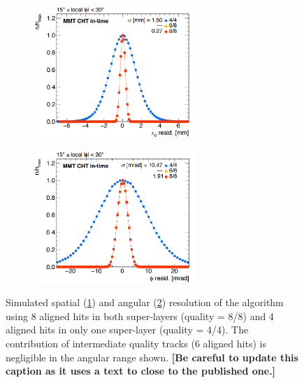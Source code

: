 	\begin{figure}[H]
		\begin{subfigure}{0.5\linewidth}
			\centering
			\includegraphics[height=5cm]{fig/chapt3/DT-spatial-res-algo.png}
			\caption{\label{fig:DT-P2-res:A}}
		\end{subfigure}
		\begin{subfigure}{0.5\linewidth}
			\centering
			\includegraphics[height=5cm]{fig/chapt3/DT-angular-res-algo.png}
			\caption{\label{fig:DT-P2-res:B}}
		\end{subfigure}
		\caption{\label{fig:DT-P2-res} Simulated spatial (\ref{fig:DT-P2-res:A}) and angular (\ref{fig:DT-P2-res:B}) resolution of the algorithm using 8 aligned hits in both super-layers (quality = 8/8) and 4 aligned hits in only one super-layer (quality = 4/4). The contribution of intermediate quality tracks (6 aligned hits) is negligible in the angular range shown. \textbf{[Be careful to update this caption as it uses a text to close to the published one.]}}
	\end{figure}
	

